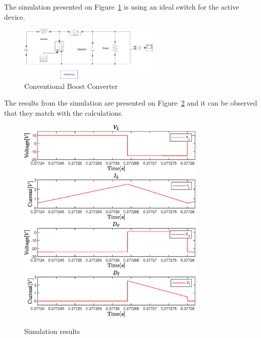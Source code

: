 The simulation presented on Figure~\ref{fig:CBC_Sim} is using an ideal switch for the active device.

\begin{figure}[H]
   \centering
   \includegraphics[width=0.6\textwidth]{figures/aConventionalBoost/CBCpic.pdf}
    \caption{Conventional Boost Converter}
	\label{fig:CBC_Sim}
\end{figure}

The results from the simulation are presented on Figure~\ref{fig:CBC_SimResults} and it can be observed that they match with the calculations. 

\begin{figure}[H]%
    \centering
    {{\includegraphics[width=0.8\textwidth]{figures/aConventionalBoost/CBC_V_LtoI_D.eps} }}%
    \qquad
    \caption{Simulation results}%
     \label{fig:CBC_SimResults}%
\end{figure}